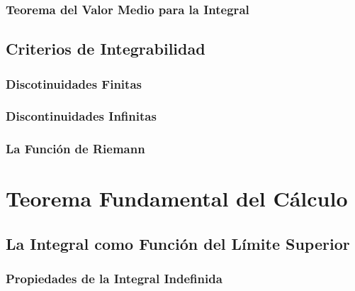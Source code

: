 		\section{Teorema del Valor Medio para la Integral} %
		\label{sec:teorema_del_valor_medio_para_la_integral}
			
	\chapter{Criterios de Integrabilidad} %
	\label{cha:criterios_de_integrabilidad}
		\section{Discotinuidades Finitas} %
		\label{sec:discotinuidades_finitas}
			
		\section{Discontinuidades Infinitas} %
		\label{sec:discontinuidades_infinitas}
			
		\section{La Función de Riemann} %
		\label{sec:la_función_de_riemann}
			
\part{Teorema Fundamental del Cálculo} %
\label{prt:teorema_ _fundamental_ _del_ _cálculo_}
	\chapter{La Integral como Función del Límite Superior} %
	\label{cha:la_integral_como_función_del_límite_superior}
		\section{Propiedades de la Integral Indefinida} %
		\label{sec:propiedades_de_la_integral_indefinida}
			
